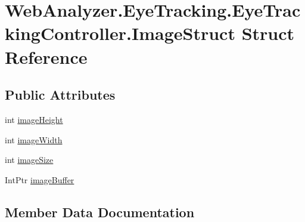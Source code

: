 \hypertarget{struct_web_analyzer_1_1_eye_tracking_1_1_eye_tracking_controller_1_1_image_struct}{}\section{Web\+Analyzer.\+Eye\+Tracking.\+Eye\+Tracking\+Controller.\+Image\+Struct Struct Reference}
\label{struct_web_analyzer_1_1_eye_tracking_1_1_eye_tracking_controller_1_1_image_struct}
\subsection*{Public Attributes}
\begin{DoxyCompactItemize}
\item 
int \hyperlink{struct_web_analyzer_1_1_eye_tracking_1_1_eye_tracking_controller_1_1_image_struct_a08e4deec51ddc700fdf81f634a53a01e}{image\+Height}
\item 
int \hyperlink{struct_web_analyzer_1_1_eye_tracking_1_1_eye_tracking_controller_1_1_image_struct_ab4cbe360570340ca7b6dbe0e922c8e9b}{image\+Width}
\item 
int \hyperlink{struct_web_analyzer_1_1_eye_tracking_1_1_eye_tracking_controller_1_1_image_struct_a81795d5c08cfc33b8302e6ff51a0f721}{image\+Size}
\item 
Int\+Ptr \hyperlink{struct_web_analyzer_1_1_eye_tracking_1_1_eye_tracking_controller_1_1_image_struct_ade7441b365dadc5e4ea9e6da589687d2}{image\+Buffer}
\end{DoxyCompactItemize}


\subsection{Member Data Documentation}
\hypertarget{struct_web_analyzer_1_1_eye_tracking_1_1_eye_tracking_controller_1_1_image_struct_ade7441b365dadc5e4ea9e6da589687d2}{}
